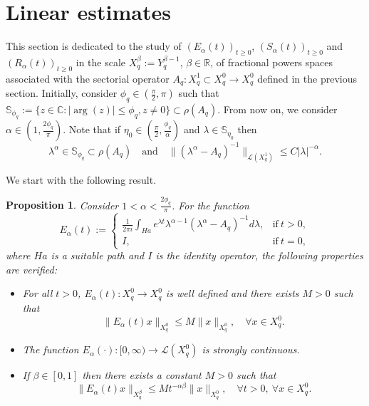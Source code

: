 \documentclass[12pt,reqno]{amsart}
\newtheorem{pr}{Proposition}
\newcommand{\R}{\mathbb{R}}	%
\newcommand{\C}{\mathbb{C}} %
\begin{document}
\section{Linear estimates}			\label{Lest}
This section is dedicated to the study of  $(E_{\alpha}(t))_{t\ge0}$, $(S_{\alpha}(t))_{t\ge0}$ and $(R_{\alpha}(t))_{t\ge0}$ in the scale $X_{q}^{\beta}:=Y_{q}^{\beta-1}$, $\beta\in\R$, of fractional powers spaces associated with the sectorial operator $A_q: X_{q}^{1}\subset X_{q}^{0}\rightarrow X_{q}^{0}$ defined in the previous section.
Initially, consider $\phi_q\in (\frac{\pi}{2}, 
\pi)$  such that $\mathbb{S}_{\phi_q}:=\{z\in\C: |\arg(z)|\leq\phi_q, z\neq 0\}\subset\rho(A_q).$
From now on, we consider $\alpha\in (1,\frac{2\phi_q}{\pi})$. Note that if $\eta_0\in (\frac{\pi}{2}, \frac{\phi_q}{\alpha})$ and $\lambda\in\mathbb{S}_{\eta_0}$ then 
$$\lambda^{\alpha}\in\mathbb{S}_{\phi_q}\subset\rho(A_q)\quad \mbox{and}\quad \|(\lambda^\alpha-A_q)^{-1}\|_{\mathcal{L}(X_{q}^{1})}\leq C|\lambda|^{-\alpha}.$$







We start with the following result.

\begin{pr}\label{lf1} Consider $1<\alpha<\frac{2\phi_q}{\pi}$. For the function 
	\begin{equation}\label{Ealfa}
		E_{\alpha}(t):=\left\{\begin{array}{ll}\displaystyle \frac{1}{2\pi i}\int_{Ha}e^{\lambda t}\lambda^{\alpha-1}(\lambda^{\alpha}-A_{q})^{-1}d\lambda, &  \mbox{if} ~  t> 0,\\
			I, &  \mbox{if} ~ t=0,\end{array}\right.
	\end{equation}
	where $Ha$ is a suitable path and $I$ is the identity operator, the following properties are verified:
	\begin{itemize}
		\item[$(i)$] For all $t>0$, $E_{\alpha}(t):X^{0}_{q}\to X^{0}_{q}$ is well defined and there exists $M>0$ such that 
		$$\|E_{\alpha}(t)x\|_{X^{0}_{q}}\leq M\|x\|_{X^{0}_{q}}, \quad  \forall x\in X^{0}_{q}.$$ 
		\item[$(ii)$] The function $E_{\alpha}(\cdot):[0,\infty)\rightarrow \mathcal{L}(X^{0}_{q})$ is strongly continuous.
		\item[$(iii)$] If  $\beta\in[0, 1]$ then there exists a constant $M>0$ such that 
		$$\|E_{\alpha}(t)x\|_{X^{\beta}_{q}}\leq M t^{-\alpha\beta}\|x\|_{X^{0}_{q}},\quad \forall t>0, \ \forall x\in X^{0}_{q}.$$
	\end{itemize} 
\end{pr}
\end{document}
